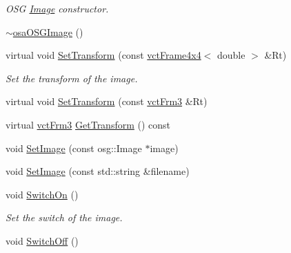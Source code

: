 \begin{DoxyCompactItemize}
\begin{DoxyCompactList}\small\item\em O\-S\-G \hyperlink{classosa_o_s_g_image_1_1_image}{Image} constructor. \end{DoxyCompactList}\item 
\hyperlink{classosa_o_s_g_image_a8173c8efc6b71132dbeb06337d58adee}{$\sim$osa\-O\-S\-G\-Image} ()
\item 
virtual void \hyperlink{classosa_o_s_g_image_aa00d15d38c9815115e1b7a9f76ea1519}{Set\-Transform} (const \hyperlink{classvct_frame4x4}{vct\-Frame4x4}$<$ double $>$ \&Rt)
\begin{DoxyCompactList}\small\item\em Set the transform of the image. \end{DoxyCompactList}\item 
virtual void \hyperlink{classosa_o_s_g_image_a726fd6ef80d91c03a7e694368df99b0a}{Set\-Transform} (const \hyperlink{vct_transformation_types_8h_a81feda0a02c2d1bc26e5553f409fed20}{vct\-Frm3} \&Rt)
\item 
virtual \hyperlink{vct_transformation_types_8h_a81feda0a02c2d1bc26e5553f409fed20}{vct\-Frm3} \hyperlink{classosa_o_s_g_image_a42485228a801d1800bdc569353698538}{Get\-Transform} () const 
\item 
void \hyperlink{classosa_o_s_g_image_af7c008cd20caffe9916f7d816fed9f30}{Set\-Image} (const osg\-::\-Image $\ast$image)
\item 
void \hyperlink{classosa_o_s_g_image_ad6144b20ccc04f42499bcbd6c7471b67}{Set\-Image} (const std\-::string \&filename)
\item 
void \hyperlink{classosa_o_s_g_image_a8e3a355e23637076ff03eb1ba8fe17e4}{Switch\-On} ()
\begin{DoxyCompactList}\small\item\em Set the switch of the image. \end{DoxyCompactList}\item 
void \hyperlink{classosa_o_s_g_image_a52fcffce17b588c0dc4e8cbc50d6194d}{Switch\-Off} ()
\end{DoxyCompactItemize}
